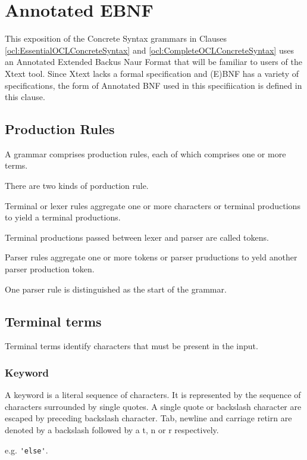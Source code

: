 \chapter{Annotated EBNF}\label{ocl:AnnotatedEBNF}

This exposition of the Concrete Syntax grammars in Clauses \ref{ocl:EssentialOCLConcreteSyntax} and \ref{ocl:CompleteOCLConcreteSyntax} uses an Annotated Extended Backus Naur Format that will be familiar to users of the Xtext tool. Since Xtext lacks a formal specification and (E)BNF has a variety of specifications, the form of Annotated BNF used in this specifiication is defined in this clause.


\section{Production Rules}

A grammar comprises production rules, each of which comprises one or more terms.

There are two kinds of porduction rule.

Terminal or lexer rules aggregate one or more characters or terminal productions to yield a terminal productions.

Terminal productions passed between lexer and parser are called tokens.

Parser rules aggregate one or more tokens or parser pruductions to yeld another parser production token.

One parser rule is distinguished as the start of the grammar. 

\section{Terminal terms}

Terminal terms identify characters that must be present in the input.

\subsection{Keyword}

A keyword is a literal sequence of characters. It is represented by the sequence of characters surrounded by single quotes. A single quote or backslash character are escaped by preceding backslash character. Tab, newline and carriage retirn are denoted by a backslash followed by a t, n or r respectively.

e.g. \verb|'else'|.

